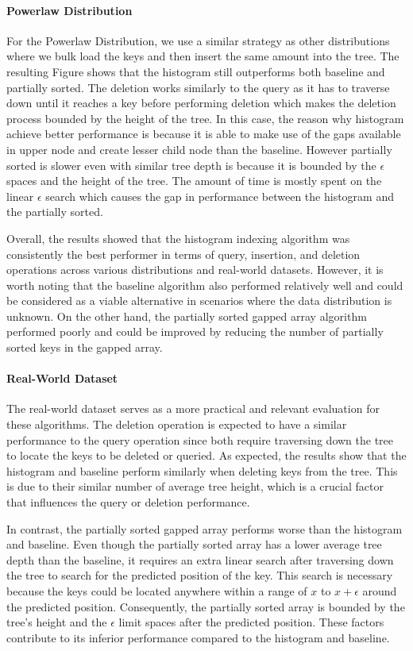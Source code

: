 \documentclass[11pt,a4paper]{article}
\begin{document}
\paragraph{Powerlaw Distribution}
For the Powerlaw Distribution, we use a similar strategy as other distributions where we bulk load the keys and then insert the same amount into the tree. The resulting Figure shows that the histogram still outperforms both baseline and partially sorted. The deletion works similarly to the query as it has to traverse down until it reaches a key before performing deletion which makes the deletion process bounded by the height of the tree. In this case, the reason why histogram achieve better performance is because it is able to make use of the gaps available in upper node and create lesser child node than the baseline. However partially sorted is slower even with similar tree depth is because it is bounded by the $\epsilon$ spaces and the height of the tree. The amount of time is mostly spent on the linear $\epsilon$ search which causes the gap in performance between the histogram and the partially sorted. 


Overall, the results showed that the histogram indexing algorithm was consistently the best performer in terms of query, insertion, and deletion operations across various distributions and real-world datasets. However, it is worth noting that the baseline algorithm also performed relatively well and could be considered as a viable alternative in scenarios where the data distribution is unknown. On the other hand, the partially sorted gapped array algorithm performed poorly and could be improved by reducing the number of partially sorted keys in the gapped array.


\paragraph{Real-World Dataset}
The real-world dataset serves as a more practical and relevant evaluation for these algorithms. The deletion operation is expected to have a similar performance to the query operation since both require traversing down the tree to locate the keys to be deleted or queried. As expected, the results show that the histogram and baseline perform similarly when deleting keys from the tree. This is due to their similar number of average tree height, which is a crucial factor that influences the query or deletion performance.

In contrast, the partially sorted gapped array performs worse than the histogram and baseline. Even though the partially sorted array has a lower average tree depth than the baseline, it requires an extra linear search after traversing down the tree to search for the predicted position of the key. This search is necessary because the keys could be located anywhere within a range of $x$ to $x + \epsilon$ around the predicted position. Consequently, the partially sorted array is bounded by the tree's height and the $\epsilon$ limit spaces after the predicted position. These factors contribute to its inferior performance compared to the histogram and baseline.
\end{document}
